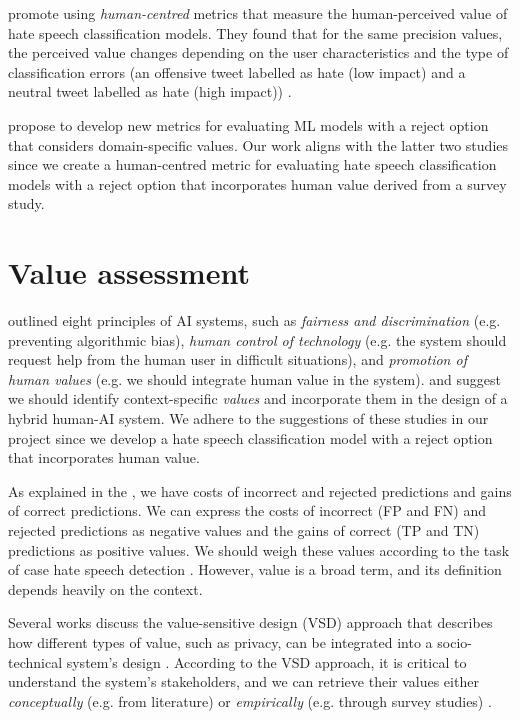 %
\citet{olteanu2017limits} promote using \textit{human-centred} metrics that measure the human-perceived value of hate speech classification models.
%
They found that for the same precision values, the perceived value changes depending on the user characteristics and the type of classification errors (an offensive tweet labelled as hate (low impact) and a neutral tweet labelled as hate (high impact)) \citep{olteanu2017limits}.
%

%
\citet{casati2021value} propose to develop new metrics for evaluating ML models with a reject option that considers domain-specific values.
%
Our work aligns with the latter two studies since we create a human-centred metric for evaluating hate speech classification models with a reject option that incorporates human value derived from a survey study.


\section{Value assessment}
\label{sec:related-work-value-assessment}
\citet{fjeld2020principled} outlined eight principles of AI systems, such as \emph{fairness and discrimination} (e.g. preventing algorithmic bias), \emph{human control of technology} (e.g. the system should request help from the human user in difficult situations), and \emph{promotion of human values} (e.g. we should integrate human value in the system).
%
\citet{sayin2021science} and \citet{casati2021value} suggest we should identify context-specific \emph{values} and incorporate them in the design of a hybrid human-AI system.
%
We adhere to the suggestions of these studies in our project since we develop a hate speech classification model with a reject option that incorporates human value.
%

%
As explained in the , we have costs of incorrect and rejected predictions and gains of correct predictions.
%
We can express the costs of incorrect (FP and FN) and rejected predictions as negative values and the gains of correct (TP and TN) predictions as positive values.
%
We should weigh these values according to the task of case hate speech detection \citep{sayin2021science}.
%
However, value is a broad term, and its definition depends heavily on the context.
%

%
Several works discuss the value-sensitive design (VSD) approach that describes how different types of value, such as privacy, can be integrated into a socio-technical system's design \citep{zhu2018value, umbrello2021mapping, cummings2006integrating}.
%
According to the VSD approach, it is critical to understand the system's stakeholders, and we can retrieve their values either \emph{conceptually} (e.g. from literature) or \emph{empirically} (e.g. through survey studies) \citep{zhu2018value, umbrello2021mapping, cummings2006integrating}.
%

